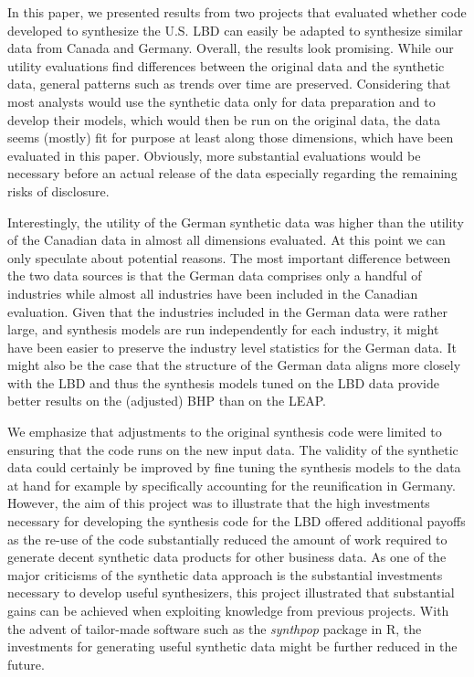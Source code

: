 
In this paper, we presented results from two projects that evaluated whether code developed to synthesize the U.S. LBD can easily be adapted to synthesize similar data from Canada and Germany. Overall, the results look promising. While our utility evaluations find differences between the original data and the synthetic data, general patterns such as trends over time are preserved. Considering that most analysts would use the synthetic data only for data preparation and to develop their models, which would then be run on the original data, the data seems (mostly) fit for purpose at least along those dimensions, which have been evaluated in this paper. Obviously, more substantial evaluations would be necessary before an actual release of the data especially regarding the remaining risks of disclosure. 

Interestingly, the utility of the German synthetic data was higher than the utility of the Canadian data in almost all dimensions evaluated. At this point we can only speculate about potential reasons. The most important difference between the two data sources is that the German data comprises only a handful of industries while almost all industries have been included in the Canadian evaluation. Given that the industries included in the German data were rather large, and synthesis models are run independently for each industry, it might have been easier to preserve the industry level statistics for the German data. It might also be the case that the structure of the German data aligns more closely with the LBD and thus the synthesis models tuned on the LBD data provide better results on the (adjusted) BHP than on the LEAP. 

We emphasize that adjustments to the original synthesis code were limited to ensuring that the code runs on the new input data. The validity of the synthetic data could certainly be improved by fine tuning the synthesis models to the data at hand for example by specifically accounting for the reunification in Germany. However, the aim of this project was to illustrate that the high investments necessary for developing the synthesis code for the LBD offered additional payoffs as the re-use of the code substantially reduced the amount of work required to generate decent synthetic data products for other business data. As one of the major criticisms of the synthetic data approach is the substantial investments necessary to develop useful synthesizers, this project illustrated that substantial gains can be achieved when exploiting knowledge from previous projects. With the advent of tailor-made software such as the \textit{synthpop} package in R, the investments for generating useful synthetic data might be further reduced in the future.
